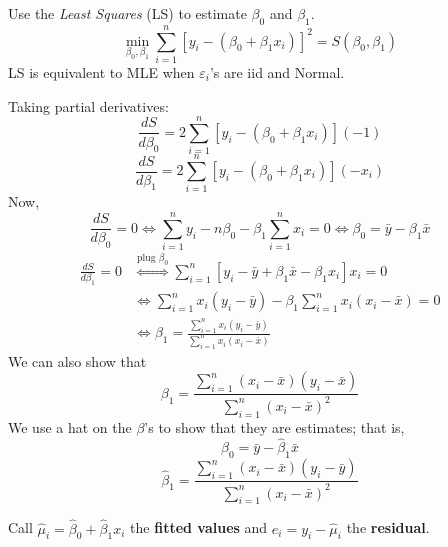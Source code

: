 Use the \emph{Least Squares} (LS) to estimate $ \beta_0 $ and $ \beta_1 $.
\[ \min_{\beta_0,\beta_1}\sum\limits_{i=1}^{n}
    \left[ y_i-(\beta_0+\beta_1 x_i) \right]^2=S(\beta_0,\beta_1) \]
LS is equivalent to MLE when $ \varepsilon_i $'s are iid and Normal.

Taking partial derivatives:
\[ \frac{dS}{d\beta_0}=2
    \sum\limits_{i=1}^{n} \left[ y_i-(\beta_0+\beta_1x_i) \right](-1)  \]
\[ \frac{dS}{d\beta_1}=2
    \sum\limits_{i=1}^{n} \left[ y_i-(\beta_0+\beta_1x_i) \right](-x_i)  \]
Now,
\[ \frac{dS}{d\beta_0}=0
    \iff \sum\limits_{i=1}^{n}y_i-n\beta_0-
    \beta_1 \sum\limits_{i=1}^{n} x_i=0
    \iff \beta_0=\bar{y}-\beta_1\bar{x}  \]
\begin{align*}
    \frac{dS}{d\beta_1}=0
     & \stackrel{\text{plug }\beta_0}{\iff}
    \sum\limits_{i=1}^{n} \left[ y_i-\bar{y}+\beta_1\bar{x}-\beta_1 x_i \right]x_i=0    \\
     & \iff \sum\limits_{i=1}^{n} x_i(y_i-\bar{y})-\beta_1
    \sum\limits_{i=1}^{n} x_i(x_i-\bar{x})=0                                            \\
     & \iff \beta_1=\frac{\sum\limits_{i=1}^{n} x_i(y_i-\bar{y})}{\sum\limits_{i=1}^{n}
        x_i
        (x_i-\bar{x})}
\end{align*}
We can also show that
\[ \beta_1=\frac{\sum\limits_{i=1}^{n} (x_i-\bar{x})(y_i-\bar{x})}{
        \sum\limits_{i=1}^{n} (x_i-\bar{x})^2
    }  \]
We use a hat on the $ \beta $'s to show that they are estimates; that is,
\[ \hat{\beta}_0=\bar{y}-\hat{\beta}_1\bar{x} \]
\[ \hat{\beta}_1=
    \frac{\sum\limits_{i=1}^{n} (x_i-\bar{x})(y_i-\bar{y})}{
        \sum\limits_{i=1}^{n} (x_i-\bar{x})^2
    }  \]

Call $ \hat{\mu}_i=\hat{\beta}_0+\hat{\beta}_1x_i $ the \textbf{fitted values}
and $ e_i=y_i-\hat{\mu}_i $ the \textbf{residual}.
